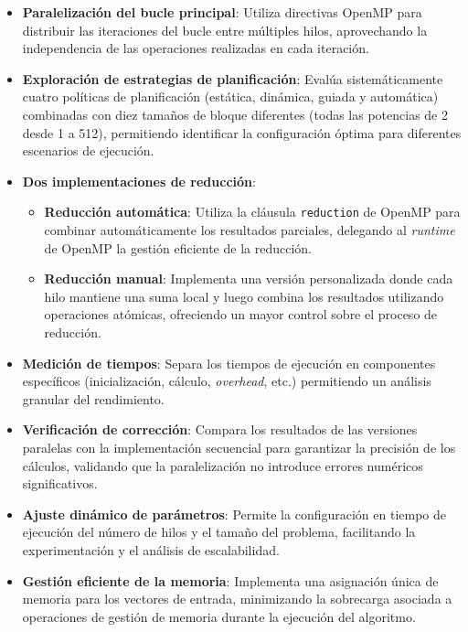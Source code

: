         \begin{itemize}

            \item \textbf{Paralelización del bucle principal}: Utiliza directivas OpenMP para distribuir las iteraciones del bucle entre múltiples hilos, aprovechando la independencia de las operaciones realizadas en cada iteración.
            
            \item \textbf{Exploración de estrategias de planificación}: Evalúa sistemáticamente cuatro políticas de planificación (estática, dinámica, guiada y automática) combinadas con diez tamaños de bloque diferentes (todas las potencias de 2 desde 1 a 512), permitiendo identificar la configuración óptima para diferentes escenarios de ejecución.

            \item \textbf{Dos implementaciones de reducción}: 
            
                \begin{itemize}
                
                    \item \textbf{Reducción automática}: Utiliza la cláusula \texttt{reduction} de OpenMP para combinar automáticamente los resultados parciales, delegando al \textit{runtime} de OpenMP la gestión eficiente de la reducción.
                    
                    \item \textbf{Reducción manual}: Implementa una versión personalizada donde cada hilo mantiene una suma local y luego combina los resultados utilizando operaciones atómicas, ofreciendo un mayor control sobre el proceso de reducción.
                    
                \end{itemize}

            \item \textbf{Medición de tiempos}: Separa los tiempos de ejecución en componentes específicos (inicialización, cálculo, \textit{overhead}, etc.) permitiendo un análisis granular del rendimiento.
            
            \item \textbf{Verificación de corrección}: Compara los resultados de las versiones paralelas con la implementación secuencial para garantizar la precisión de los cálculos, validando que la paralelización no introduce errores numéricos significativos.
            
            \item \textbf{Ajuste dinámico de parámetros}: Permite la configuración en tiempo de ejecución del número de hilos y el tamaño del problema, facilitando la experimentación y el análisis de escalabilidad.
            
            \item \textbf{Gestión eficiente de la memoria}: Implementa una asignación única de memoria para los vectores de entrada, minimizando la sobrecarga asociada a operaciones de gestión de memoria durante la ejecución del algoritmo.
                    
        \end{itemize}
            
